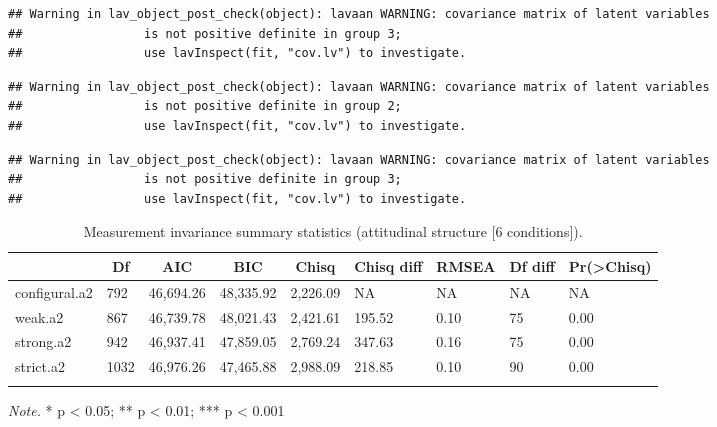 \documentclass[
  man]{apa6}
\begin{document}
\begin{verbatim}
## Warning in lav_object_post_check(object): lavaan WARNING: covariance matrix of latent variables
##                 is not positive definite in group 3;
##                 use lavInspect(fit, "cov.lv") to investigate.
\end{verbatim}

\begin{verbatim}
## Warning in lav_object_post_check(object): lavaan WARNING: covariance matrix of latent variables
##                 is not positive definite in group 2;
##                 use lavInspect(fit, "cov.lv") to investigate.
\end{verbatim}

\begin{verbatim}
## Warning in lav_object_post_check(object): lavaan WARNING: covariance matrix of latent variables
##                 is not positive definite in group 3;
##                 use lavInspect(fit, "cov.lv") to investigate.
\end{verbatim}

\begin{table}[tbp]

\begin{center}
\begin{threeparttable}

\caption{\label{tab:measinv.siop2.att}Measurement invariance summary statistics (attitudinal structure [6 conditions]).}

\begin{tabular}{lllllllll}
\toprule
 & \multicolumn{1}{c}{Df} & \multicolumn{1}{c}{AIC} & \multicolumn{1}{c}{BIC} & \multicolumn{1}{c}{Chisq} & \multicolumn{1}{c}{Chisq diff} & \multicolumn{1}{c}{RMSEA} & \multicolumn{1}{c}{Df diff} & \multicolumn{1}{c}{Pr(>Chisq)}\\
\midrule
configural.a2 & 792 & 46,694.26 & 48,335.92 & 2,226.09 & NA & NA & NA & NA\\
weak.a2 & 867 & 46,739.78 & 48,021.43 & 2,421.61 & 195.52 & 0.10 & 75 & 0.00\\
strong.a2 & 942 & 46,937.41 & 47,859.05 & 2,769.24 & 347.63 & 0.16 & 75 & 0.00\\
strict.a2 & 1032 & 46,976.26 & 47,465.88 & 2,988.09 & 218.85 & 0.10 & 90 & 0.00\\
\bottomrule
\addlinespace
\end{tabular}

\begin{tablenotes}[para]
\normalsize{\textit{Note.} * p < 0.05; ** p < 0.01; *** p < 0.001}
\end{tablenotes}

\end{threeparttable}
\end{center}

\end{table}
\end{document}
